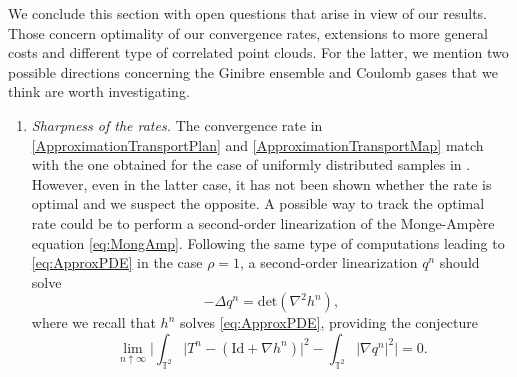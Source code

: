 \documentclass[11pt,a4paper,oneside]{amsart}
\numberwithin{equation}{section}
\newcommand{\fm}[1]{\textcolor{blue}{[F: #1]}}
\begin{document}
We conclude this section with open questions that arise in view of our results. Those concern optimality of our convergence rates, extensions to more general costs and different type of correlated point clouds. For the latter, we mention two possible directions concerning the Ginibre ensemble and Coulomb gases that we think are worth investigating.
%
\begin{enumerate}
%
\item \emph{Sharpness of the rates. }The convergence rate in \eqref{ApproximationTransportPlan} and \eqref{ApproximationTransportMap} match with the one obtained for the case of uniformly distributed samples in \cite{ambrosio2019optimal}. However, even in the latter case, it has not been shown whether the rate is optimal and we suspect the opposite. A possible way to track the optimal rate could be to perform a second-order linearization of the Monge-Ampère equation \eqref{eq:MongAmp}. Following the same type of computations leading to \eqref{eq:ApproxPDE} in the case $\rho=1$, a second-order linearization $q^n$ should solve 
%
$$-\Delta q^n=\text{det}(\nabla^2 h^n),$$
%
where we recall that $h^n$ solves \eqref{eq:ApproxPDE}, providing the conjecture 
%
$$\lim_{n\uparrow\infty}\bigg\vert\int_{\mathbb{T}^2}\vert T^n-(\text{Id}+\nabla h^n)\vert^2-\int_{\mathbb{T}^2}\vert\nabla q^n\vert^2\bigg\vert=0.$$
%


%
\medskip
%


\end{enumerate}
\end{document}
